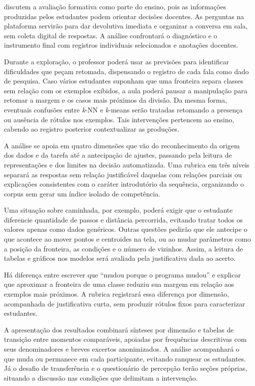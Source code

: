 discutem a avaliação formativa como parte do ensino, pois as informações produzidas pelos estudantes podem orientar decisões docentes. As perguntas na plataforma servirão para dar devolutiva imediata e organizar a conversa em sala, sem coleta digital de respostas. A análise confrontará o diagnóstico e o instrumento final com registros individuais selecionados e anotações docentes.

Durante a exploração, o professor poderá usar as previsões para identificar dificuldades que peçam retomada, dispensando o registro de cada fala como dado de pesquisa. Caso vários estudantes suponham que uma fronteira separa classes sem relação com os exemplos exibidos, a aula poderá pausar a manipulação para retomar a margem e os casos mais próximos da divisão. Da mesma forma, eventuais confusões entre \textit{k}-NN e \textit{k}-means serão tratadas retomando a presença ou ausência de rótulos nos exemplos. Tais intervenções pertencem ao ensino, cabendo ao registro posterior contextualizar as produções.

A análise se apoia em quatro dimensões que vão do reconhecimento da origem dos dados e da tarefa até a antecipação de ajustes, passando pela leitura de representações e dos limites na decisão automatizada. Uma rubrica em três níveis separará as respostas sem relação justificável daquelas com relações parciais ou explicações consistentes com o caráter introdutório da sequência, organizando o corpus sem gerar um índice isolado de competência.

Uma situação sobre caminhada, por exemplo, poderá exigir que o estudante diferencie quantidade de passos e distância percorrida, evitando tratar todos os valores apenas como dados genéricos. Outras questões pedirão que ele antecipe o que acontece ao mover pontos e centroides na tela, ou ao mudar parâmetros como a posição da fronteira, as condições e o número de vizinhos. Assim, a leitura de tabelas e gráficos nos modelos será avaliada pela justificativa dada ao acerto.

Há diferença entre escrever que ``mudou porque o programa mudou'' e explicar que aproximar a fronteira de uma classe reduziu sua margem em relação aos exemplos mais próximos. A rubrica registrará essa diferença por dimensão, acompanhada de justificativa curta, sem produzir rótulos fixos para caracterizar estudantes.

A apresentação dos resultados combinará sínteses por dimensão e tabelas de transição entre momentos comparáveis, apoiadas por frequências descritivas com seus denominadores e breves excertos anonimizados. A análise acompanhará o que muda ou permanece em cada participante, evitando ranquear os estudantes. Já o desafio de transferência e o questionário de percepção terão seções próprias, situando a discussão nas condições que delimitam a intervenção.

